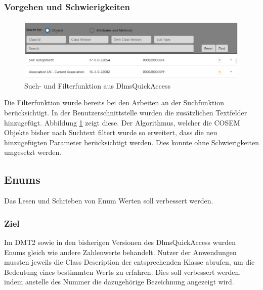 \subsubsection{Vorgehen und Schwierigkeiten}
\begin{figure}
   \centering
   \includegraphics[width=1.0\textwidth]{gfx/searchfilter.png}
   \caption{
      Such- und Filterfunktion aus DlmsQuickAccess 
      }
      \label{fig:searchfilterUIRel}
\end{figure}
Die Filterfunktion wurde bereits bei den Arbeiten an der Suchfunktion berücksichtigt.
In der Benutzerschnittstelle wurden die zusätzlichen Textfelder hinzugefügt.
Abbildung \ref{fig:searchfilterUIRel} zeigt diese.
Der Algorithmus, welcher die \ac{COSEM} Objekte bisher nach Suchtext filtert wurde so erweitert, dass die neu hinzugefügten Parameter berücksichtigt werden.
Dies konnte ohne Schwierigkeiten umgesetzt werden.



\subsection{Enums}
\dq Das Lesen und Schrieben von Enum Werten soll verbessert werden.\dq
\subsubsection{Ziel}
Im \ac{DMT2} sowie in den bisherigen Versionen des DlmsQuickAccess wurden Enums gleich wie andere Zahlenwerte behandelt.
Nutzer der Anwendungen mussten jeweils die Class Description der entsprechenden Klasse abrufen, um die Bedeutung eines bestimmten Werts zu erfahren.
Dies soll verbessert werden, indem anstelle des Nummer die dazugehörige Bezeichnung angezeigt wird.

